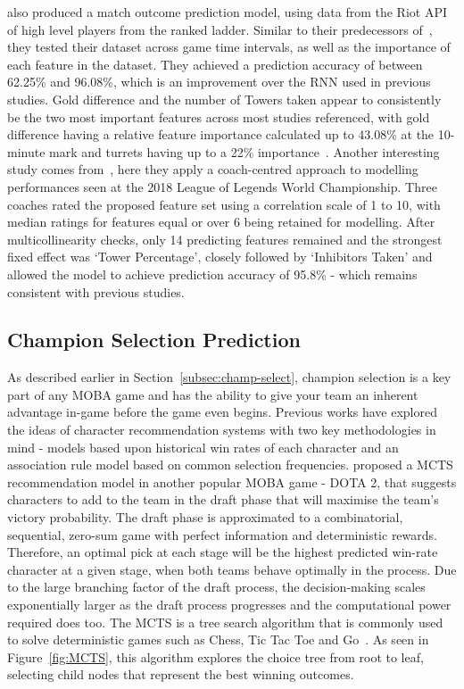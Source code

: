 \citet{lee2020predicting} also produced a match outcome prediction model, using data from the Riot API of high level players from the ranked ladder.
Similar to their predecessors of~\citet{silva2018continuous}, they tested their dataset across game time intervals, as well as the importance of each feature in the dataset.
They achieved a prediction accuracy of between 62.25\% and 96.08\%, which is an improvement over the \ac{RNN} used in previous studies.
Gold difference and the number of Towers taken appear to consistently be the two most important features across most studies referenced, with gold difference having a relative feature importance calculated up to 43.08\% at the 10-minute mark and turrets having up to a 22\% importance~\citep{lee2020predicting, ani2019victory, gaina2018league}.
Another interesting study comes from~\citet{novak2020performance}, here they apply a coach-centred approach to modelling performances seen at the 2018 League of Legends World Championship.
Three coaches rated the proposed feature set using a correlation scale of 1 to 10, with median ratings for features equal or over 6 being retained for modelling.
After multicollinearity checks, only 14 predicting features remained and the strongest fixed effect was `Tower Percentage', closely followed by `Inhibitors Taken' and allowed the model to achieve prediction accuracy of 95.8\% - which remains consistent with previous studies.


\subsection{Champion Selection Prediction}\label{subsec:Champion Selection Prediction}
As described earlier in Section~\ref{subsec:champ-select}, champion selection is a key part of any MOBA game and has the ability to give your team an inherent advantage in-game before the game even begins.
Previous works have explored the ideas of character recommendation systems with two key methodologies in mind - models based upon historical win rates of each character and an association rule model based on common selection frequencies.
\citet{chen2018art} proposed a \ac{MCTS} recommendation model in another popular MOBA game - DOTA 2, that suggests characters to add to the team in the draft phase that will maximise the team's victory probability.
The draft phase is approximated to a combinatorial, sequential, zero-sum game with perfect information and deterministic rewards.
Therefore, an optimal pick at each stage will be the highest predicted win-rate character at a given stage, when both teams behave optimally in the process.
Due to the large branching factor of the draft process, the decision-making scales exponentially larger as the draft process progresses and the computational power required does too.
The \ac{MCTS} is a tree search algorithm that is commonly used to solve deterministic games such as Chess, Tic Tac Toe and Go~\citep{alphago2016}.
As seen in Figure~\ref{fig:MCTS}, this algorithm explores the choice tree from root to leaf, selecting child nodes that represent the best winning outcomes.

